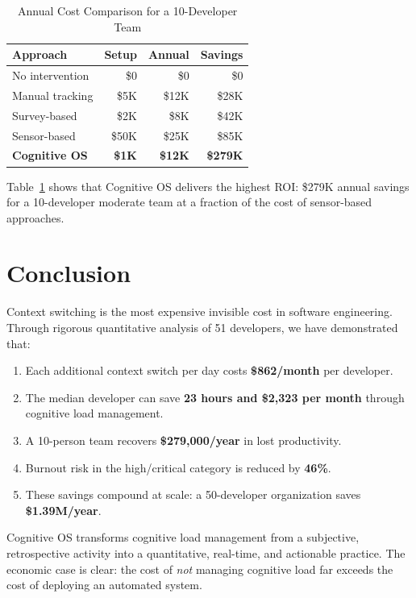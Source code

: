 \documentclass[11pt, twocolumn]{article}
\begin{document}
\begin{table}[t]
\centering
\caption{Annual Cost Comparison for a 10-Developer Team}
\label{tab:cost_comparison}
\begin{tabular}{@{}lrrr@{}}
\toprule
\textbf{Approach} & \textbf{Setup} & \textbf{Annual} & \textbf{Savings} \\
\midrule
No intervention    & \$0    & \$0       & \$0 \\
Manual tracking    & \$5K   & \$12K     & \$28K \\
Survey-based       & \$2K   & \$8K      & \$42K \\
Sensor-based       & \$50K  & \$25K     & \$85K \\
\textbf{Cognitive OS} & \textbf{\$1K} & \textbf{\$12K} & \textbf{\$279K} \\
\bottomrule
\end{tabular}
\end{table}

Table~\ref{tab:cost_comparison} shows that Cognitive OS delivers the highest ROI: \$279K annual savings for a 10-developer moderate team at a fraction of the cost of sensor-based approaches.

\section{Conclusion}

Context switching is the most expensive invisible cost in software engineering. Through rigorous quantitative analysis of 51 developers, we have demonstrated that:

\begin{enumerate}[noitemsep]
    \item Each additional context switch per day costs \textbf{\$862/month} per developer.
    \item The median developer can save \textbf{23 hours and \$2,323 per month} through cognitive load management.
    \item A 10-person team recovers \textbf{\$279,000/year} in lost productivity.
    \item Burnout risk in the high/critical category is reduced by \textbf{46\%}.
    \item These savings compound at scale: a 50-developer organization saves \textbf{\$1.39M/year}.
\end{enumerate}

Cognitive OS transforms cognitive load management from a subjective, retrospective activity into a quantitative, real-time, and actionable practice. The economic case is clear: the cost of \emph{not} managing cognitive load far exceeds the cost of deploying an automated system.


\end{document}
